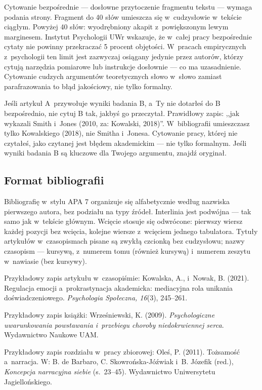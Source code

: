 \documentclass[12pt,a4paper,twoside,openany]{book}
\begin{document}
Cytowanie bezpośrednie --- dosłowne przytoczenie fragmentu tekstu --- wymaga podania strony. Fragment do 40 słów umieszcza się w~cudzysłowie w~tekście ciągłym. Powyżej 40 słów: wyodrębniony akapit z~powiększonym lewym marginesem. Instytut Psychologii UWr wskazuje, że w~całej pracy bezpośrednie cytaty nie powinny przekraczać 5 procent objętości. W~pracach empirycznych z~psychologii ten limit jest zazwyczaj osiągany jedynie przez autorów, którzy cytują narzędzia pomiarowe lub instrukcje dosłownie --- co ma uzasadnienie. Cytowanie cudzych argumentów teoretycznych słowo w~słowo zamiast parafrazowania to błąd jakościowy, nie tylko formalny.

\begin{warningbox}
Jeśli artykuł A~przywołuje wyniki badania B, a~Ty nie dotarłeś do B bezpośrednio, nie cytuj B tak, jakbyś go przeczytał. Prawidłowy zapis: ,,jak wykazali Smith i~Jones (2010, za: Kowalski, 2018)''. W~bibliografii umieszczasz tylko Kowalskiego (2018), nie Smitha i~Jonesa. Cytowanie pracy, której nie czytałeś, jako czytanej jest błędem akademickim --- nie tylko formalnym. Jeśli wyniki badania B są kluczowe dla Twojego argumentu, znajdź oryginał.
\end{warningbox}

\subsection{Format bibliografii}

Bibliografię w~stylu APA 7 organizuje się alfabetycznie według nazwiska pierwszego autora, bez podziału na typy źródeł. Interlinia jest podwójna --- tak samo jak w~tekście głównym. Wcięcie stosuje się odwrócone: pierwszy wiersz każdej pozycji bez wcięcia, kolejne wiersze z~wcięciem jednego tabulatora. Tytuły artykułów w~czasopismach pisane są zwykłą czcionką bez cudzysłowu; nazwy czasopism --- kursywą, z~numerem tomu (również kursywą) i~numerem zeszytu w~nawiasie (bez kursywy).

Przykładowy zapis artykułu w~czasopiśmie: Kowalska, A., i~Nowak, B. (2021). Regulacja emocji a~prokrastynacja akademicka: mediacyjna rola unikania doświadczeniowego. \textit{Psychologia Społeczna, 16}(3), 245--261.

Przykładowy zapis książki: Wrześniewski, K. (2009). \textit{Psychologiczne uwarunkowania powstawania i~przebiegu choroby niedokrwiennej serca}. Wydawnictwo Naukowe UAM.

Przykładowy zapis rozdziału w~pracy zbiorowej: Oleś, P. (2011). Tożsamość a~narracja. W: B. de Barbaro, C. Skowrońska-Jóźwiak i~B. Józefik (red.), \textit{Koncepcja narracyjna siebie} (s.~23--45). Wydawnictwo Uniwersytetu Jagiellońskiego.
\end{document}
